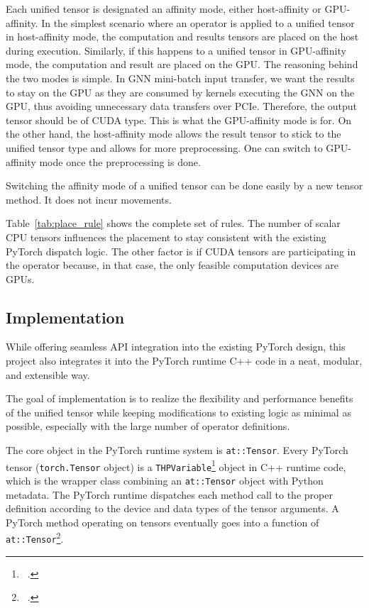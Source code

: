 Each unified tensor is designated an affinity mode, either host-affinity or GPU-affinity.
In the simplest scenario where an operator is applied to a unified tensor in host-affinity mode, the computation and results tensors are placed on the host during execution.
Similarly, if this happens to a unified tensor in GPU-affinity mode, the computation and result are placed on the GPU.
The reasoning behind the two modes is simple.
In GNN mini-batch input transfer, we want the results to stay on the GPU as they are consumed by kernels executing the GNN on the GPU, thus avoiding unnecessary data transfers over PCIe.
Therefore, the output tensor should be of CUDA type.
This is what the GPU-affinity mode is for.
On the other hand, the host-affinity mode allows the result tensor to stick to the unified tensor type and allows for more preprocessing.
One can switch  to GPU-affinity mode once the preprocessing is done.

Switching the affinity mode of a unified tensor can be done easily by a new tensor method.
It does not incur movements.

Table~\ref{tab:place_rule} shows the complete set of rules.
The number of scalar CPU tensors influences the placement to stay consistent with the existing PyTorch dispatch logic.
The other factor is if CUDA tensors are participating in the operator because, in that case, the only feasible computation devices are GPUs.




\subsection{Implementation}
\label{sec:impl}
While offering seamless API integration into the existing PyTorch design, this project also integrates it into the PyTorch runtime C++ code in a neat, modular, and extensible way.

The goal of implementation is to realize the flexibility and performance benefits of the unified tensor while keeping modifications to existing logic as minimal as possible, especially with the large number of operator definitions.


The core object in the PyTorch runtime system is \texttt{at::Tensor}.
Every PyTorch tensor (\texttt{torch.Tensor} object) is a \texttt{THPVariable}\footnote{~\cite{edwardz.yangPytorchTorchCsrc2017}.} object in C++ runtime code, which is the wrapper class combining an \texttt{at::Tensor} object with Python metadata.
The PyTorch runtime dispatches each method call to the proper definition according to the device and data types of the tensor arguments.
A PyTorch method operating on tensors eventually goes into a function of \texttt{at::Tensor}\footnote{~\cite{edwardz.yangATenAtenSrc2018}.}.



